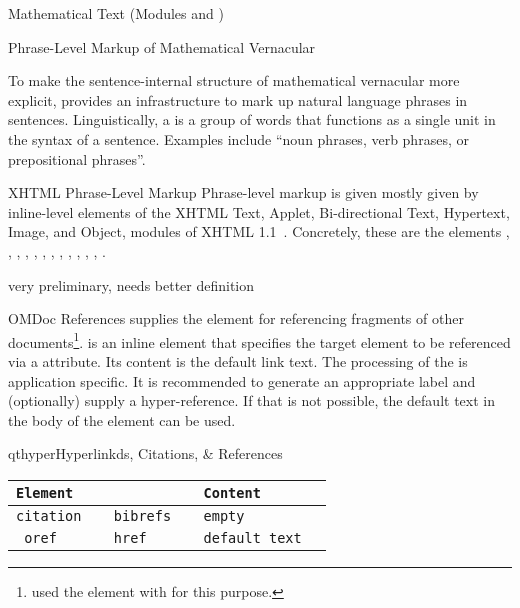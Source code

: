 \begin{tchapter}[id=mtxt,short=Mathematical Text]{Mathematical Text (Modules
   and )}
\begin{tsection}[id=phrases]{Phrase-Level Markup of Mathematical Vernacular}

  To make the sentence-internal structure of mathematical vernacular more explicit,
  \omdoc provides an infrastructure to mark up natural language phrases in
  sentences. Linguistically, a  is a group of words that functions as a
  single unit in the syntax of a sentence. Examples include ``noun phrases, verb phrases,
  or prepositional phrases''. 

\begin{tsubsection}{XHTML Phrase-Level Markup}
  Phrase-level markup is given mostly given by inline-level elements of the XHTML Text,
  Applet, Bi-directional Text, Hypertext, Image, and Object, modules of XHTML
  1.1~\cite{McCarron:xhtmlmods1.1}. Concretely, these are the elements ,
  , , , , ,
  , , , , ,
  , .
\end{tsubsection}


\begin{newpart}{very preliminary, needs better definition}
\begin{tsubsection}{OMDoc References}
  \omdoc supplies the  element for referencing fragments of other
  documents\footnote{ used the  element with
      for this
    purpose.}.  is an inline element that specifies the target element to
  be referenced via a  attribute. Its content is the default link
  text.  The processing of the  is application specific. It is
  recommended to generate an appropriate label and (optionally) supply a
  hyper-reference. If that is not possible, the default text in the body of the
   element can be used.
\end{tsubsection}
\end{newpart}

\begin{myfig}{qthyper}{Hyperlinkds, Citations, \& References}
  \begin{scriptsize}
\begin{tabular}{|>{\tt}l|>{\tt}l|>{\tt}l|>{\tt}l|}\hline
{\rm Element}& \multicolumn{2}{l|}{Attributes\hspace*{2.25cm}} & Content  \\\hline
 citation & bibrefs & empty &\\\hline
 oref & href & default text&\\\hline
\end{tabular}
\end{scriptsize}
\end{myfig}


\end{tsection}
\end{tchapter}

